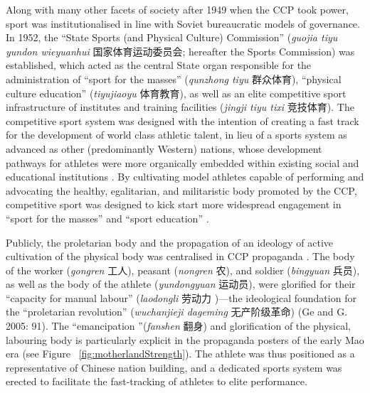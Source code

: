\begin{CJK}{UTF8}{gbsn}
 Along with many other facets of society after 1949 when the CCP took power, sport was institutionalised in line with Soviet bureaucratic models of governance.  In 1952, the ``State Sports (and Physical Culture) Commission'' (\textit{guojia tiyu yundon wieyuanhui} 国家体育运动委员会; hereafter the Sports Commission) was established, which acted as the central State organ responsible for the administration of ``sport for the masses'' (\textit{qunzhong tiyu} 群众体育), ``physical culture education'' (\textit{tiyujiaoyu} 体育教育), as well as an elite competitive sport infrastructure of institutes and training facilities (\textit{jingji tiyu tixi} 竞技体育).
 The competitive sport system was designed with the intention of creating a fast track for the development of world class athletic talent, in lieu of a sports system as advanced as other (predominantly Western) nations, whose development pathways for athletes were more organically embedded within existing social and educational institutions \citep{Brownell2008}.  By cultivating model athletes capable of performing and advocating the healthy, egalitarian, and militaristic body promoted by the CCP, competitive sport was designed to kick start more widespread engagement in ``sport for the masses'' and ``sport education'' \citep[56]{Brownell1995}.

 Publicly, the proletarian body and the propagation of an ideology of active cultivation of the physical body was centralised in CCP propaganda \citep[58]{Brownell1995}.  The body of the worker (\textit{gongren} 工人), peasant (\textit{nongren} 农), and soldier (\textit{bingyuan} 兵员), as well as the body of the athlete (\textit{yundongyuan} 运动员), were glorified for their ``capacity for manual labour'' (\textit{laodongli} 劳动力 )---the ideological foundation for the ``proletarian revolution'' (\textit{wuchanjieji dageming} 无产阶级革命) (Ge and G. 2005: 91).
 The ``emancipation ''(\textit{fanshen} 翻身) and glorification of the physical, labouring body is particularly explicit in the propaganda posters of the early Mao era \citep[87]{Ge2005} (see Figure ~\ref{fig:motherlandStrength}).  The athlete was thus positioned as a representative of Chinese nation building, and a dedicated sports system was erected to facilitate the fast-tracking of athletes to elite performance.


\end{CJK}
